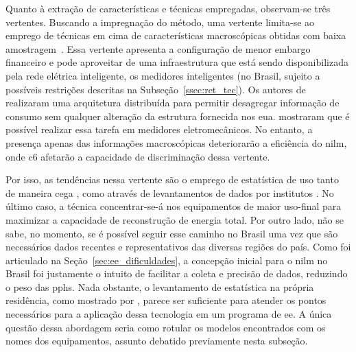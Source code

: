Quanto à extração de características e técnicas empregadas, observam-se
três vertentes. Buscando a impregnação do método, uma vertente
limita-se ao emprego de técnicas em cima de características
macroscópicas obtidas com baixa
amostragem~\cite{nilm_hart_1992_8,nilm_cole_data_extraction_1998_14,
nilm_cole_extra_info_surge_1998_15, nilm_norford_leeb_medianfilt_1996_13,
nilm_leeb_spectral_envelope_1995_23, nilm_powers_15minsamp_1991_16,
nilm_farinaccio_16ssamp_1999_17, nilm_marceau_16ssamp_improved_1999_18,
nilm_baranski_genetic_base_2003_19,
nilm_baranski_genetic_detalhado_2004_20,nilm_baranski_summary_2004_21,
nilm_bergman_distribuido_2011,nilm_genetic_2013,nilm_zeifman_vast_2011,
nilm_zeifman_vastext_approach_2012,
nilm_zeifman_statistical_vastext_1stws_2012,
nilm_zeifman_statistical_naive_enduses_2013}. Essa vertente apresenta
a configuração de menor embargo financeiro e pode aproveitar de uma
infraestrutura que está sendo disponibilizada pela rede elétrica
inteligente, os medidores inteligentes (no Brasil, sujeito a possíveis
restrições descritas na Subseção~\ref{ssec:ret_tec}).  Os autores de
\cite{nilm_bergman_distribuido_2011} realizaram uma arquitetura
distribuída para permitir desagregar informação de consumo sem
qualquer alteração da estrutura fornecida nos \gls{eua}.
\cite{nilm_baranski_genetic_base_2003_19,
nilm_baranski_genetic_detalhado_2004_20,nilm_baranski_summary_2004_21}
mostraram que é possível realizar essa tarefa em medidores
eletromecânicos. No entanto, a presença apenas das informações
macroscópicas deteriorarão a eficiência do \gls{nilm}, onde
\gls{c6} afetarão a capacidade de discriminação dessa vertente.

Por isso, as tendências nessa vertente são o emprego de estatística de
uso tanto de maneira cega \cite{nilm_zeifman_vast_2011,
nilm_zeifman_vastext_approach_2012,
nilm_zeifman_statistical_vastext_1stws_2012}, como através de
levantamentos de dados por institutos
\cite{nilm_zeifman_statistical_naive_enduses_2013}. No último caso, a
técnica concentrar-se-á nos equipamentos de maior uso-final para
maximizar a capacidade de reconstrução de energia total. Por outro
lado, não se sabe, no momento, se é possível seguir esse caminho no
Brasil uma vez que são necessários dados recentes e representativos
das diversas regiões do país. Como foi articulado na
Seção~\ref{sec:ee_dificuldades}, a concepção inicial para o
\gls{nilm} no Brasil foi justamente o intuito de facilitar a coleta e
precisão de dados, reduzindo o peso das \glspl{pph}. Nada obstante, o
levantamento de estatística na própria residência, como mostrado por
\cite{nilm_zeifman_vastext_approach_2012,nilm_zeifman_statistical_vastext_1stws_2012},
parece ser suficiente para atender os pontos necessários para a
aplicação dessa tecnologia em um programa de \gls{ee}. A única questão
dessa abordagem seria como rotular os modelos encontrados com os
nomes dos equipamentos, assunto debatido previamente nesta subseção.

